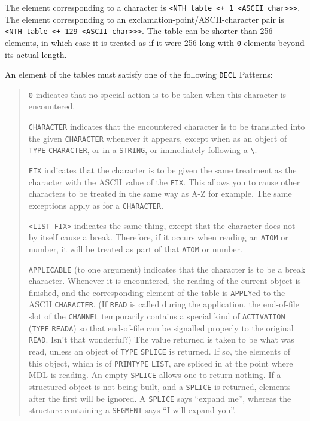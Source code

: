 \documentclass[a4paper,]{article}
\begin{document}
The element corresponding to a character is
\texttt{\textless{}NTH\ table\ \textless{}+\ 1\ \textless{}ASCII\ char\textgreater{}\textgreater{}\textgreater{}}. The
element corresponding to an exclamation-point/ASCII-character pair is
\texttt{\textless{}NTH\ table\ \textless{}+\ 129\ \textless{}ASCII\ char\textgreater{}\textgreater{}\textgreater{}}. The
table can be shorter than 256 elements, in which case it is treated as if it were 256 long with \texttt{0} elements beyond
its actual length.

An element of the tables must satisfy one of the following \texttt{DECL} Patterns:

\begin{quote}
\texttt{\textquotesingle{}0} indicates that no special action is to be taken when this character is encountered.

\texttt{CHARACTER} indicates that the encountered character is to be translated into the given
\texttt{CHARACTER} whenever it appears, except when as an object of \texttt{TYPE} \texttt{CHARACTER}, or in a
\texttt{STRING}, or immediately following a \texttt{\textbackslash{}}.

\texttt{FIX} indicates that the character is to be given the same treatment as the character with the ASCII value of the
\texttt{FIX}. This allows you to cause other characters to be treated in the same way as A-Z for example. The same
exceptions apply as for a \texttt{CHARACTER}.

\texttt{\textless{}LIST\ FIX\textgreater{}} indicates the same thing, except that the character does not by itself cause a
break. Therefore, if it occurs when reading an \texttt{ATOM} or number, it will be treated as part of that \texttt{ATOM} or
number.

\texttt{APPLICABLE} (to one argument) indicates that the character is to be a break character. Whenever it is encountered,
the reading of the current object is finished, and the corresponding element of the table is \texttt{APPLY}ed to the ASCII
\texttt{CHARACTER}. (If \texttt{READ} is called during the application, the end-of-file slot of the \texttt{CHANNEL}
temporarily contains a special kind of \texttt{ACTIVATION} (\texttt{TYPE} \texttt{READA}) so
that end-of-file can be signalled properly to the original \texttt{READ}. Isn't that wonderful?) The value returned is
taken to be what was read, unless an object of \texttt{TYPE} \texttt{SPLICE} is returned. If
so, the elements of this object, which is of \texttt{PRIMTYPE} \texttt{LIST}, are spliced in at the point where MDL is
reading. An empty \texttt{SPLICE} allows one to return nothing. If a structured object is not being built, and a
\texttt{SPLICE} is returned, elements after the first will be ignored. A \texttt{SPLICE} says ``expand me'', whereas the
structure containing a \texttt{SEGMENT} says ``I will expand you''.


\end{quote}
\end{document}
